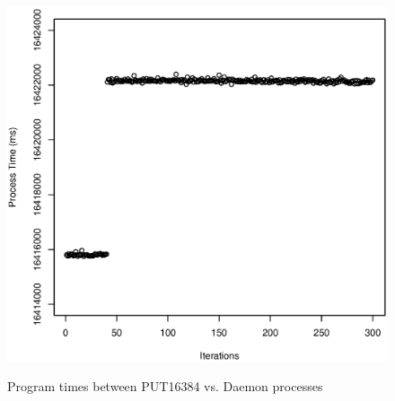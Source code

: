 \documentclass[10pt]{article}
\begin{document}
\begin{figure}[htp!]
{		\includegraphics[scale=0.35]{put16384_pt.eps}
		\label{fig:put16384_pt}
	}
	\caption{Program times between PUT16384 vs. Daemon processes~\label{fig:put_daemon_pt7}}
\end{figure}
\end{document}
